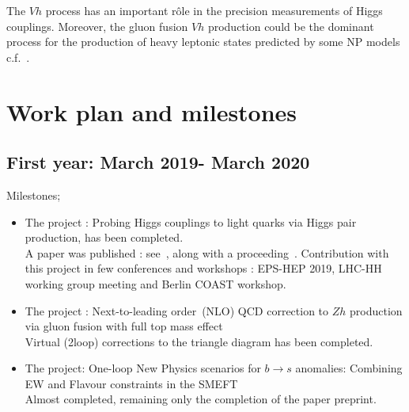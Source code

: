 \documentclass[12pt]{article}
\begin{document}
\par The  $Vh$ process has an important r\^ole in the precision measurements of Higgs couplings. Moreover, the gluon fusion $Vh$ production could be the dominant process for the production of heavy leptonic states predicted by  some NP models c.f.~\cite{Ruiz:2017yyf}.
 \section*{Work plan and milestones }
 \subsection*{First year: March 2019- March 2020}
Milestones;
 \begin{itemize}
 \item The project : Probing Higgs couplings to light quarks via Higgs pair production, has been completed. \\
 A paper was published : see~\cite{Alasfar:2019pmn}, along with a proceeding~\cite{Alasfar:2019wby}. Contribution with this project in few conferences and workshops : EPS-HEP 2019, LHC-HH working group meeting and Berlin COAST workshop.
 \item The project : Next-to-leading order~(NLO) QCD correction to $Zh$ production via gluon fusion  with full top mass effect\\ Virtual (2loop) corrections to the triangle diagram has been completed. 
 \item The project:  One-loop New Physics scenarios for $b \to s$ anomalies: Combining EW and Flavour constraints in the SMEFT \\ Almost completed, remaining only the completion of the paper preprint. 
 \end{itemize}
\end{document}
